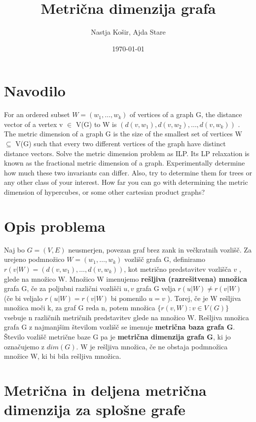 \documentclass[a4paper]{report}
\title{Metrična dimenzija grafa }
\author{Nastja Košir, Ajda Stare}
\date{\today}
\begin{document}
	\maketitle

\section*{Navodilo}
For an ordered subset $W = (w_1 , \dots, w_k ) $ of vertices of a graph G, the distance vector of a vertex v $\in$ V(G)  to  W  is  $(d(v, w_1 ), d(v, w_2 ), \dots, d(v, w_k ))$ . The metric dimension of a graph G is the size of the smallest set of vertices W  $\subseteq $ V(G) such that every two different vertices of the graph have distinct distance vectors. Solve the metric dimension problem as ILP. Its LP relaxation is known as the fractional metric dimension of a graph. Experimentally determine how much these two invariants can differ. Also, try to determine them for trees or any other class of your interest. How far you can go with determining the metric dimension of hypercubes, or some other cartesian product graphs?\\

\section*{Opis problema}
Naj bo $G=(V,E)$ neusmerjen, povezan graf brez zank in večkratnih vozlišč. Za urejeno podmnožico $ W =(w_1 , \dots, w_k )$ vozlišč grafa G, definiramo\\$r(v|W) = (d(v,w_1),\dots, d(v,w_k))$, kot  metrično predstavitev vozlišča $v$ , glede na množico W. Množico W imenujemo \textbf{rešljiva (razrešitvena) množica} grafa G, če za poljubni  različni vozlišči $u,v$ grafa G velja $r(u|W)\neq r(v|W)$ (če bi veljalo $r(u|W)= r(v|W)$ bi pomenilo $u = v$ ). Torej, če je W rešljiva množica moči k, za graf G reda n, potem množica $\{r(v,W): v\in V(G)\}$ vsebuje n različnih metričnih predstavitev glede na množico W. Rešljiva množica grafa G z najmanjšim številom vozlišč se imenuje \textbf{metrična baza grafa G}. Število vozlišč metrične baze G pa je \textbf{metrična dimenzija grafa G}, ki jo označujemo z \textbf{$dim(G)$}. W je rešljiva množica, če ne obstaja podmnožica množice W, ki bi bila rešljiva množica.  

\section*{Metrična in deljena metrična dimenzija za splošne grafe}
\end{document}

